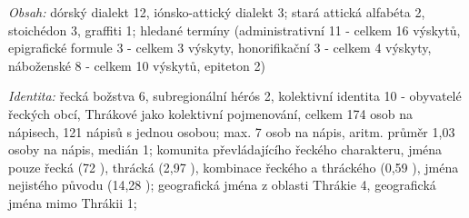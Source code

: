 {\em Obsah:} dórský dialekt 12, iónsko-attický dialekt 3; stará attická alfabéta 2, stoichédon 3, graffiti 1; hledané termíny (administrativní 11 - celkem 16 výskytů, epigrafické formule 3 - celkem 3 výskyty, honorifikační 3 - celkem 4 výskyty, náboženské 8 - celkem 10 výskytů, epiteton 2)

{\em Identita:} řecká božstva 6, subregionální hérós 2, kolektivní identita 10 - obyvatelé řeckých obcí, Thrákové jako kolektivní pojmenování, celkem 174 osob na nápisech, 121 nápisů s jednou osobou; max. 7 osob na nápis, aritm. průměr 1,03 osoby na nápis, medián 1; komunita převládajícího řeckého charakteru, jména pouze řecká (72 ), thrácká (2,97 ), kombinace řeckého a thráckého (0,59 ), jména nejistého původu (14,28 ); geografická jména z oblasti Thrákie 4, geografická jména mimo Thrákii 1;

\NC\AR
\HL
\HL
\stoptable

